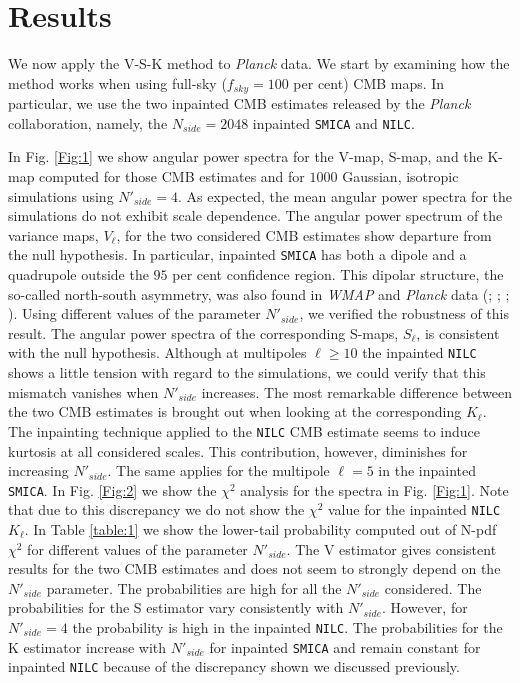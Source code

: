 \section{Results}
\label{s:results}

We now apply the V-S-K method to \textit{Planck} data. We start by examining how the method works when using full-sky ($f_{sky}=100$ per cent) CMB maps. In particular, we use the two inpainted CMB estimates released by the \textit{Planck} collaboration, namely, the $N_{side}=2048$ inpainted \texttt{SMICA} and \texttt{NILC}. 

In Fig. \ref{Fig:1} we show angular power spectra for the V-map, S-map, and the K-map computed for those CMB estimates and for $1000$ Gaussian, isotropic simulations using $N'_{side} = 4$. As expected, the mean angular power spectra for the simulations do not exhibit scale dependence. The angular power spectrum of the variance maps, $V_{\ell}$, for the two considered CMB estimates show  departure from the null hypothesis. In particular, inpainted \texttt{SMICA} has both a dipole and a quadrupole outside the $95$ per cent confidence region. This dipolar structure,  the so-called north-south asymmetry, was also found in \textit{WMAP} and \textit{Planck} data (\cite{Eriksen:2003db}; \cite{Hansen:2008ym}; \cite{Ade:2013nlj}; \cite{Akrami:2014eta}). Using different values of the parameter $N'_{side}$, we verified the robustness of this result. The angular power spectra of the corresponding S-maps, $S_{\ell}$, is consistent with the null hypothesis. Although at multipoles $\ell \geq 10$ the inpainted \texttt{NILC} shows  a little tension with regard to the simulations, we could verify that this mismatch vanishes when $N'_{side}$ increases. The most remarkable difference between the two CMB estimates is brought out when looking at the corresponding $K_{\ell}$. The inpainting technique applied to the \texttt{NILC} CMB estimate seems to induce kurtosis at all considered scales. This contribution, however, diminishes for increasing $N'_{side}$. The same applies for the multipole $\ell=5$ in the inpainted \texttt{SMICA}. In Fig. \ref{Fig:2} we show the $\chi^2$ analysis for the spectra in Fig. \ref{Fig:1}. Note that due to this discrepancy we do not show the $\chi^2$ value for the inpainted \texttt{NILC} $K_{\ell}$. In Table \ref{table:1} we show the lower-tail probability computed out of N-pdf $\chi^2$ for different values of the parameter $N'_{side}$. The V estimator gives consistent results for the two CMB estimates and does not seem to strongly depend on the $N'_{side}$ parameter. The probabilities are high for all the $N'_{side}$ considered. The probabilities for the S estimator vary consistently with $N'_{side}$. However, for $N'_{side}=4$ the probability is high in the inpainted \texttt{NILC}. The probabilities for the K estimator increase with $N'_{side}$ for inpainted \texttt{SMICA} and remain constant for inpainted \texttt{NILC} because of the discrepancy shown we discussed previously.

